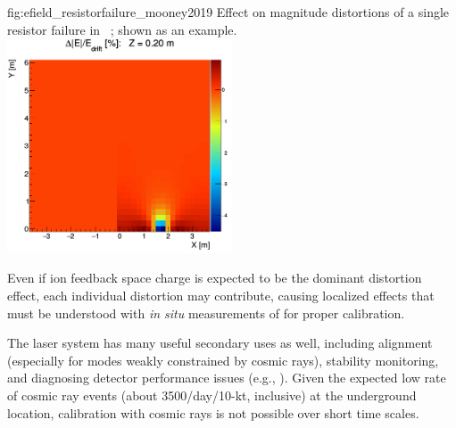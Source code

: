 \begin{dunefigure}{fig:efield_resistorfailure_mooney2019}
{Effect on \efield magnitude distortions of a single  resistor failure in ~\cite{bib:mooney2019a}; shown as an example. 
}
\includegraphics[width=0.5\textwidth]{graphics/efield_resistorfailure_mooney2019.png}
\end{dunefigure}


Even if ion feedback space charge is expected to be the dominant \efield distortion effect,
each individual \efield distortion may contribute, causing localized effects that must be understood with \textit{in situ} measurements of \efield for proper calibration. 

The laser system has many useful secondary uses as well, including alignment (especially for modes weakly constrained by cosmic rays),
stability monitoring, and diagnosing detector performance issues
(e.g., ).  
Given the expected low rate of cosmic ray events (about 3500/day/10-kt, inclusive) at the underground location, calibration with cosmic rays is not possible over short time scales. 

